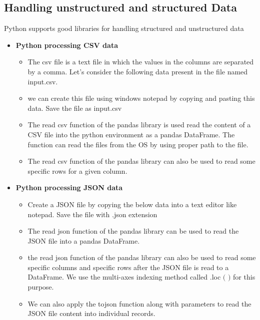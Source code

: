 \documentclass[oneside,12pt]{Classes/VTU}
\begin{document}
  \subsection{Handling unstructured and structured Data} Python supports good libraries for handling structured and unstructured data
  \begin{itemize}
		\item \textbf{Python processing CSV data}
		\begin{itemize}
		\item The csv file is a text file in which the values in the columns are separated by a comma. Let's consider the following data present in the file named input.csv.
		\item we can create this file using windows notepad by copying and pasting this data. Save the file as input.csv 
				\item The read csv function of the pandas library is used read the content of a CSV file into the python environment as a pandas DataFrame. The function can read the files from the OS by using proper path to the file.
		\item The read csv function of the pandas library can also be used to read some specific rows for a given column.
		\end{itemize} 
		\item \textbf{Python processing JSON data}
			\begin{itemize}
		\item Create a JSON file by copying the below data into a text editor like notepad. Save the file with .json extension
		\item The read json function of the pandas library can be used to read the JSON file into a pandas DataFrame. 
		\item  the read json function of the pandas library can also be used to read some specific columns and specific rows after the JSON file is read to a DataFrame. We use the multi-axes indexing method called .loc $($ $)$ for this purpose.
		\item We can also apply the tojson function along with parameters to read the JSON file content into individual records.
		\end{itemize} 
	\end{itemize}
  
\end{document}
